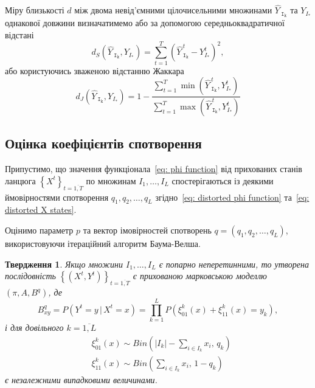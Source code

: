 \documentclass[]{iptconf}
\newcommand*{\scaleq}[2][4]{\scalebox{#1}{$#2$}}%
\theoremstyle{plain}
\newtheorem{claim}{\indent Твердження}
\begin{document}
Міру близькості $d$ між двома невід'ємними цілочисельними множинами $\widehat{Y\,}_{\mathtt{I_k}}$ та $Y_{I_*}$ однакової довжини визначатимемо або за допомогою середньоквадратичної відстані
\begin{equation}\label{eq: square average distance}
    d_{S}\left( \widehat{Y\,}_{\mathtt{I_k}},Y_{I_*} \right) = \sum_{t=1}^{T}\left( \widehat{Y\,}^t_{\mathtt{I_k}} - Y^t_{I_*} \right)^2,
\end{equation}
або користуючись зваженою відстанню Жаккара~\cite{Chierichetti2010}
\begin{equation}\label{eq: weighted Jaccard distance}
    d_{J}\left( \widehat{Y\,}_{\mathtt{I_k}},Y_{I_*} \right) = 1 - \frac{\sum\limits_{t=1}^{T}\min{\left( \widehat{Y\,}^t_{\mathtt{I_k}},Y^t_{I_*} \right)}}{\sum\limits_{t=1}^{T}\max{\left( \widehat{Y\,}^t_{\mathtt{I_k}},Y^t_{I_*} \right)}}
\end{equation}

\subsection{Оцінка коефіцієнтів спотворення}

Припустимо, що значення функціонала~\eqref{eq: phi function} від прихованих станів ланцюга $\left\{ X^t \right\}_{t=\overline{1,T}}$ по множинам $I_1,\ldots,I_L$ спостерігаються із деякими ймовірностями спотворення $q_1,q_2,\ldots,q_L$ згідно~\eqref{eq: distorted phi function} та~\eqref{eq: distorted X states}.

Оцінимо параметр $p$ та вектор імовірностей спотворень $q=\left( q_1,q_2,\ldots,q_L \right)$, використовуючи ітераційний алгоритм Баума-Велша.

\begin{claim}
    Якщо множини $I_1,\ldots,I_L$ є попарно неперетинними, то утворена послідовність $\left\{ \left( X^t,Y^t \right) \right\}_{t=\overline{1,T}}$ є прихованою марковською моделлю $\left( \pi,A,B^q \right)$, де 
    \begin{equation*}
        B^q_{xy} = P\left( Y^t=y\,|\,X^t=x \right) = \prod\limits_{k=1}^{L} P\left( \xi^k_{01}(x) + \xi^k_{11}(x) = y_k \right),
    \end{equation*}
    і для довільного $k=\overline{1,L}$
    \begin{align*}
        & \xi^k_{01}(x) \sim Bin\left( |I_k| - \sum_{i \in I_k} x_i,\, q_k \right) \\
        & \xi^k_{11}(x) \sim Bin\left( \sum_{i \in I_k} x_i,\, 1 - q_k \right)
    \end{align*}
    є незалежними випадковими величинами. 
\end{claim}
\end{document}
